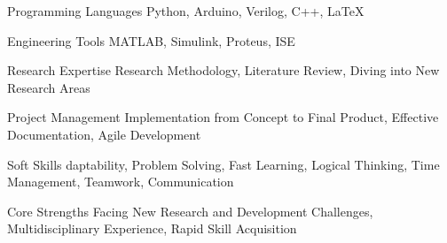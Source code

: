 

\begin{cvskills}
	
	\cvskill
	{Programming Languages} %
	{Python, Arduino, Verilog, C++, LaTeX} %
	
	\cvskill
	{Engineering Tools} %
	{MATLAB, Simulink, Proteus, ISE} %
	
	\cvskill
	{Research Expertise} %
	{Research Methodology, Literature Review, Diving into New Research Areas} %
	
	\cvskill
	{Project Management} %
	{Implementation from Concept to Final Product, Effective Documentation, Agile Development} %
	
	\cvskill
	{Soft Skills} %
	{daptability, Problem Solving, Fast Learning, Logical Thinking, Time Management, Teamwork, Communication} %
	
	\cvskill
	{Core Strengths} %
	{Facing New Research and Development Challenges, Multidisciplinary Experience, Rapid Skill Acquisition} %
\end{cvskills}

